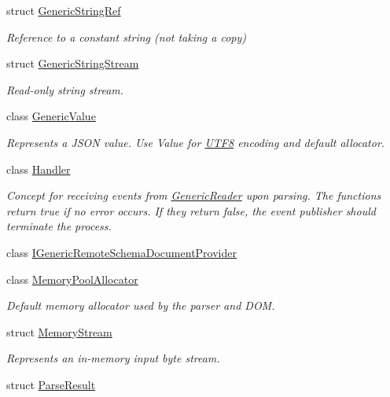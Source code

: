 \begin{DoxyCompactItemize}
struct \mbox{\hyperlink{structrapidjson_1_1_generic_string_ref}{Generic\+String\+Ref}}
\begin{DoxyCompactList}\small\item\em Reference to a constant string (not taking a copy) \end{DoxyCompactList}\item 
struct \mbox{\hyperlink{structrapidjson_1_1_generic_string_stream}{Generic\+String\+Stream}}
\begin{DoxyCompactList}\small\item\em Read-\/only string stream. \end{DoxyCompactList}\item 
class \mbox{\hyperlink{classrapidjson_1_1_generic_value}{Generic\+Value}}
\begin{DoxyCompactList}\small\item\em Represents a J\+S\+ON value. Use Value for \mbox{\hyperlink{structrapidjson_1_1_u_t_f8}{U\+T\+F8}} encoding and default allocator. \end{DoxyCompactList}\item 
class \mbox{\hyperlink{classrapidjson_1_1_handler}{Handler}}
\begin{DoxyCompactList}\small\item\em Concept for receiving events from \mbox{\hyperlink{classrapidjson_1_1_generic_reader}{Generic\+Reader}} upon parsing. The functions return true if no error occurs. If they return false, the event publisher should terminate the process. \end{DoxyCompactList}\item 
class \mbox{\hyperlink{classrapidjson_1_1_i_generic_remote_schema_document_provider}{I\+Generic\+Remote\+Schema\+Document\+Provider}}
\item 
class \mbox{\hyperlink{classrapidjson_1_1_memory_pool_allocator}{Memory\+Pool\+Allocator}}
\begin{DoxyCompactList}\small\item\em Default memory allocator used by the parser and D\+OM. \end{DoxyCompactList}\item 
struct \mbox{\hyperlink{structrapidjson_1_1_memory_stream}{Memory\+Stream}}
\begin{DoxyCompactList}\small\item\em Represents an in-\/memory input byte stream. \end{DoxyCompactList}\item 
struct \mbox{\hyperlink{structrapidjson_1_1_parse_result}{Parse\+Result}}

\end{DoxyCompactItemize}
